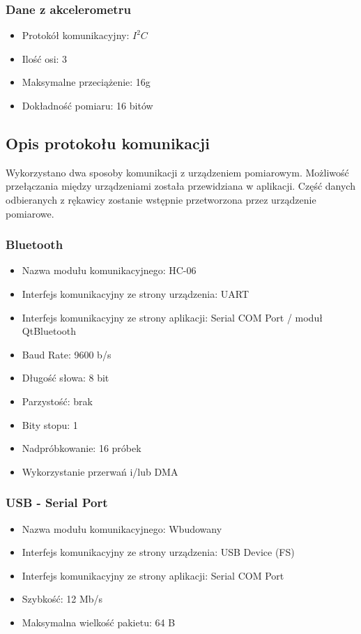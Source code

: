 \documentclass[12pt,a4paper]{article}
\begin{document}
\subsubsection{Dane z akcelerometru}
\begin{itemize}
\item Protokół komunikacyjny: $I^2C$
\item Ilość osi: 3
\item Maksymalne przeciążenie: 16g
\item Dokładność pomiaru: 16 bitów 
\end{itemize}

\subsection{Opis protokołu komunikacji}
Wykorzystano dwa sposoby komunikacji z urządzeniem pomiarowym. Możliwość przełączania między urządzeniami została przewidziana w aplikacji. Część danych odbieranych z rękawicy zostanie wstępnie przetworzona przez urządzenie pomiarowe.
\subsubsection{Bluetooth}
\begin{itemize}
\item Nazwa modułu komunikacyjnego: HC-06
\item Interfejs komunikacyjny ze strony urządzenia: UART
\item Interfejs komunikacyjny ze strony aplikacji: Serial COM Port / moduł QtBluetooth
\item Baud Rate: 9600 b/s
\item Długość słowa: 8 bit
\item Parzystość: brak
\item Bity stopu: 1
\item Nadpróbkowanie: 16 próbek
\item Wykorzystanie przerwań i/lub DMA
\end{itemize}
\subsubsection{USB - Serial Port}
\begin{itemize}
\item Nazwa modułu komunikacyjnego: Wbudowany
\item Interfejs komunikacyjny ze strony urządzenia: USB Device (FS)
\item Interfejs komunikacyjny ze strony aplikacji: Serial COM Port
\item Szybkość: 12 Mb/s
\item Maksymalna wielkość pakietu: 64 B
\end{itemize}
\end{document}
